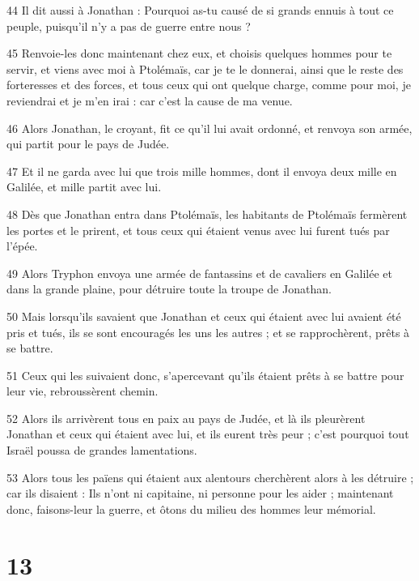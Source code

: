 \par 44 Il dit aussi à Jonathan : Pourquoi as-tu causé de si grands ennuis à tout ce peuple, puisqu'il n'y a pas de guerre entre nous ?
\par 45 Renvoie-les donc maintenant chez eux, et choisis quelques hommes pour te servir, et viens avec moi à Ptolémaïs, car je te le donnerai, ainsi que le reste des forteresses et des forces, et tous ceux qui ont quelque charge, comme pour moi, je reviendrai et je m'en irai : car c'est la cause de ma venue.
\par 46 Alors Jonathan, le croyant, fit ce qu'il lui avait ordonné, et renvoya son armée, qui partit pour le pays de Judée.
\par 47 Et il ne garda avec lui que trois mille hommes, dont il envoya deux mille en Galilée, et mille partit avec lui.
\par 48 Dès que Jonathan entra dans Ptolémaïs, les habitants de Ptolémaïs fermèrent les portes et le prirent, et tous ceux qui étaient venus avec lui furent tués par l'épée.
\par 49 Alors Tryphon envoya une armée de fantassins et de cavaliers en Galilée et dans la grande plaine, pour détruire toute la troupe de Jonathan.
\par 50 Mais lorsqu'ils savaient que Jonathan et ceux qui étaient avec lui avaient été pris et tués, ils se sont encouragés les uns les autres ; et se rapprochèrent, prêts à se battre.
\par 51 Ceux qui les suivaient donc, s'apercevant qu'ils étaient prêts à se battre pour leur vie, rebroussèrent chemin.
\par 52 Alors ils arrivèrent tous en paix au pays de Judée, et là ils pleurèrent Jonathan et ceux qui étaient avec lui, et ils eurent très peur ; c'est pourquoi tout Israël poussa de grandes lamentations.
\par 53 Alors tous les païens qui étaient aux alentours cherchèrent alors à les détruire ; car ils disaient : Ils n'ont ni capitaine, ni personne pour les aider ; maintenant donc, faisons-leur la guerre, et ôtons du milieu des hommes leur mémorial.

\chapter{13}

